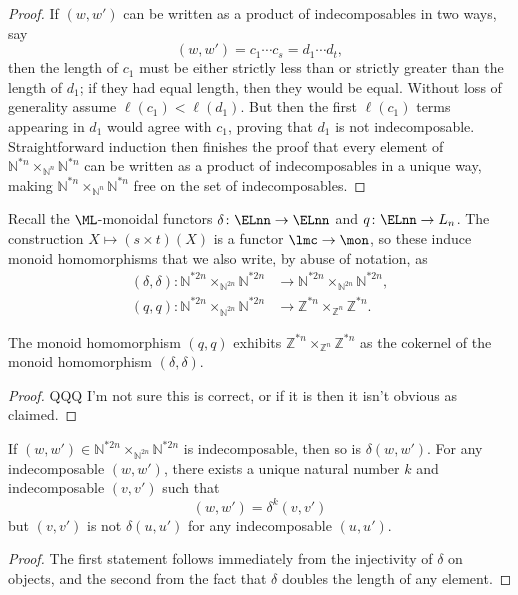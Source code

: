 \begin{proof}
If $(w,w')$ can be written as a product of indecomposables in two ways, say 
  \[
    (w,w') = c_1 \cdots c_s = d_1 \cdots d_t,
  \]
then the length  of $c_1$ must be either strictly less than or strictly greater than the length of $d_1$; if they had equal length, then they would be equal. Without loss of generality assume $\ell(c_1) < \ell(d_1)$. But then the first $\ell(c_1)$ terms appearing in $d_1$ would agree with $c_1$, proving that $d_1$ is not indecomposable. Straightforward induction then finishes the proof that every element of $\mathbb{N}^{\ast n} \times_{\mathbb{N}^n} \mathbb{N}^{\ast n}$ can be written as a product of indecomposables in a unique way, making $\mathbb{N}^{\ast n} \times_{\mathbb{N}^n} \mathbb{N}^{\ast n}$ free on the set of indecomposables.
\end{proof}

Recall the $\ML$-monoidal functors $\delta \colon \ELnn \rightarrow \ELnn$ and $q \colon \ELnn \rightarrow L_n$. The construction $X \mapsto (s \times t)(X)$ is a functor $\lmc \rightarrow \mon$, so these induce monoid homomorphisms that we also write, by abuse of notation, as 
  \begin{align*}
    (\delta, \delta) \colon  \mathbb{N}^{\ast 2n} \times_{\mathbb{N}^{2n}} \mathbb{N}^{\ast 2n} &\rightarrow \mathbb{N}^{\ast 2n} \times_{\mathbb{N}^{2n}} \mathbb{N}^{\ast 2n}, \\
    (q, q) \colon  \mathbb{N}^{\ast 2n} \times_{\mathbb{N}^{2n}} \mathbb{N}^{\ast 2n} &\rightarrow \mathbb{Z}^{\ast n} \times_{\mathbb{Z}^n} \mathbb{Z}^{\ast n}. 
  \end{align*}

\begin{lem}\label{monoid_coeq}
The monoid homomorphism $(q,q)$ exhibits $\mathbb{Z}^{\ast n} \times_{\mathbb{Z}^n} \mathbb{Z}^{\ast n}$ as the cokernel of the monoid homomorphism $(\delta, \delta)$.
\end{lem}
\begin{proof}
QQQ I'm not sure this is correct, or if it is then it isn't obvious as claimed.
\end{proof}

\begin{lem}\label{rho_lemmas}
If $(w,w') \in \mathbb{N}^{\ast 2n} \times_{\mathbb{N}^{2n}} \mathbb{N}^{\ast 2n}$ is indecomposable, then so is $\delta(w,w')$. For any indecomposable $(w,w')$, there exists a unique natural number $k$ and indecomposable $(v,v')$ such that
  \[
    (w,w') = \delta^k(v,v')
  \]
but $(v,v')$ is not $\delta(u,u')$ for any indecomposable $(u,u')$.
\end{lem}
\begin{proof}
The first statement follows immediately from the injectivity of $\delta$ on objects, and the second from the fact that $\delta$ doubles the length of any element.
\end{proof}


